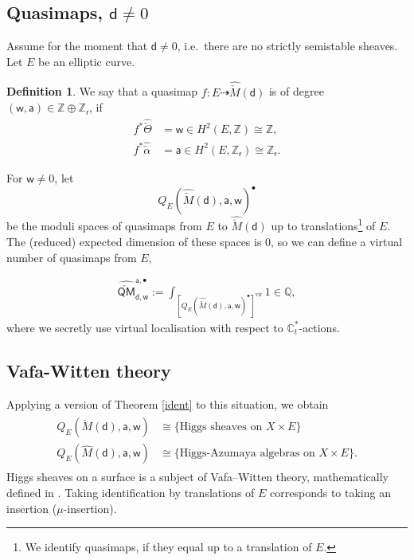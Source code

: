 \documentclass[11pt, reqno]{amsart}
\theoremstyle{plain}
\theoremstyle{definition}
\newtheorem{defn}[thm]{Definition}
\theoremstyle{remark}
\newcommand{\BC}{{\mathbb{C}}}
\newcommand{\BQ}{{\mathbb{Q}}}
\newcommand{\BZ}{{\mathbb{Z}}}
\newcommand{\wsf}{{\mathsf{w}}}
\newcommand{\rsf}{{\mathsf{r}}}
\newcommand{\dsf}{{\mathsf{d}}}
\newcommand{\asf}{{\mathsf{a}}}
\newcommand{\Ms}{\check{M}}
\newcommand{\Mp}{\hat{M}}
\newcommand{\Msp}{\hat{\check{M}}}
\newcommand{\QMsp}{\hat{\check{\mathsf{QM}}}}
\newcommand{\Thetasp}{\hat{\check{\Theta}}}
\newcommand{\alphasp}{\hat{\check{\alpha}}}
\begin{document}
\subsection{Quasimaps, $\dsf\neq0$} Assume for the moment that $\dsf\neq 0$, i.e.\ there are no strictly semistable sheaves.  Let $E$ be an elliptic curve. 

\begin{defn} We say that a quasimap $f \colon E \dashrightarrow \Msp(\dsf)$ is of degree $(\wsf,\asf) \in \BZ \oplus \BZ_\rsf$, if 
	\vspace{-0.2cm}
\begin{align*}f^*\Thetasp&=\wsf \in H^2(E,\BZ)\cong \BZ, \\
	 f^*\alphasp&=\asf \in H^2(E, \BZ_\rsf)\cong \BZ_\rsf. 
	 \end{align*}
	 \end{defn}
 For $\wsf\neq0$,  let  
\[ Q_{E}(\Msp(\dsf), \asf,\wsf)^{\bullet} \] 
be the moduli spaces of quasimaps from $E$ to $\Msp(\dsf)$ up to translations\footnote{We identify quasimaps, if they equal up to a translation of $E$.} of $E$. 
The (reduced) expected dimension of these spaces is 0, so we can define a virtual number of quasimaps from $E$, 

\begin{align*}
	 \QMsp^{\asf, \bullet}_{\dsf,\wsf}:= \int_{[Q_{E}(\Msp(\dsf),\asf,\wsf)^{\bullet}]^{\mathrm{vir}}} 1 \in \BQ,
\end{align*} 
where we secretly use virtual localisation with respect to $\BC^*_t$-actions.  
\subsection{Vafa-Witten theory} \label{vwqm} Applying a version of Theorem \ref{ident} to this situation, we obtain 
\begin{align*} 
	\begin{split}
  Q_{E}(\Ms(\dsf), \asf,\wsf)&\cong \{ \text{Higgs sheaves on } X\times E\} \\
Q_{E}(\Mp(\dsf), \asf,\wsf)&\cong \{ \text{Higgs-Azumaya algebras on } X\times E\}.
\end{split}
\end{align*}
Higgs sheaves on a surface is a subject of Vafa--Witten theory, mathematically defined in \cite{TT, TT2}. 
Taking identification by translations of $E$ corresponds to taking an insertion ($\mu$-insertion). 
\end{document}
